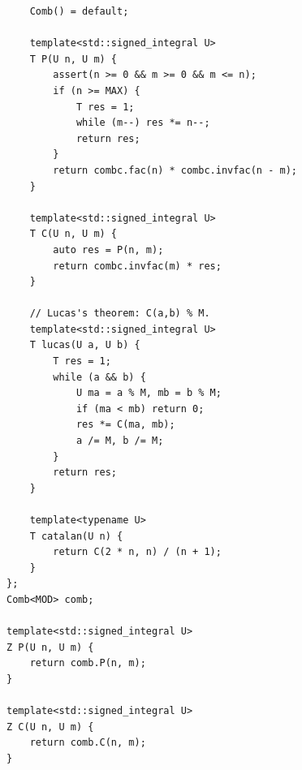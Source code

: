 \documentclass[UTF8,twoside]{ctexart}
\begin{document}
\begin{lstlisting}
    Comb() = default;

    template<std::signed_integral U>
    T P(U n, U m) {
        assert(n >= 0 && m >= 0 && m <= n);
        if (n >= MAX) {
            T res = 1;
            while (m--) res *= n--;
            return res;
        }
        return combc.fac(n) * combc.invfac(n - m);
    }

    template<std::signed_integral U>
    T C(U n, U m) {
        auto res = P(n, m);
        return combc.invfac(m) * res;
    }

    // Lucas's theorem: C(a,b) % M.
    template<std::signed_integral U>
    T lucas(U a, U b) {
        T res = 1;
        while (a && b) {
            U ma = a % M, mb = b % M;
            if (ma < mb) return 0;
            res *= C(ma, mb);
            a /= M, b /= M;
        }
        return res;
    }

    template<typename U>
    T catalan(U n) {
        return C(2 * n, n) / (n + 1);
    }
};
Comb<MOD> comb;

template<std::signed_integral U>
Z P(U n, U m) {
    return comb.P(n, m);
}

template<std::signed_integral U>
Z C(U n, U m) {
    return comb.C(n, m);
}
\end{lstlisting}
\end{document}
